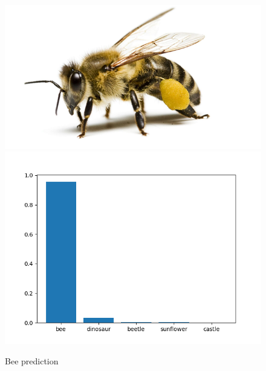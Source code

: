 \documentclass[12pt,english]{article}
\begin{document}
\begin{figure}[H]
\centering
\includegraphics[scale=0.27]{bee.png}
\includegraphics[scale=0.75]{bee_prediction.png}
\caption{Bee prediction}
\end{figure}
\end{document}
